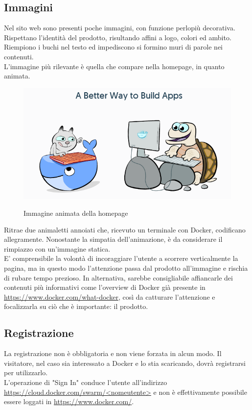 \documentclass[a4paper]{article}
\begin{document}
\subsection{Immagini}
Nel sito web sono presenti poche immagini, con funzione perlopiù decorativa. Rispettano l'identità del prodotto, risultando affini a logo, colori ed ambito. Riempiono i buchi nel testo ed impediscono si formino muri di parole nei contenuti.
\\
L'immagine più rilevante è quella che compare nella homepage, in quanto animata. 

\begin{figure}[H]
	\centering
	\includegraphics[width=\linewidth]{images/animalihomepage.png}
    \label{fig:animalianimati}
    \caption{Immagine animata della homepage}
\end{figure}

\noindent Ritrae due animaletti annoiati che, ricevuto un terminale con Docker, codificano allegramente. Nonostante la simpatia dell'animazione, è da considerare il rimpiazzo con un'immagine statica.
\\
E' comprensibile la volontà di incoraggiare l'utente a scorrere verticalmente la pagina, ma in questo modo l'attenzione passa dal prodotto all'immagine e rischia di rubare tempo prezioso. In alternativa, sarebbe consigliabile affiancarle dei contenuti più informativi come l'overview di Docker già presente in \url{https://www.docker.com/what-docker}, così da catturare l'attenzione e focalizzarla su ciò che è importante: il prodotto.

\subsection{Registrazione}
La registrazione non è obbligatoria e non viene forzata in alcun modo. Il visitatore, nel caso sia interessato a Docker e lo stia scaricando, dovrà registrarsi per utilizzarlo.
\\
L'operazione di "Sign In" conduce l'utente all'indirizzo \url{https://cloud.docker.com/swarm/<nomeutente>} e non è effettivamente possibile essere loggati in \url{https://www.docker.com/}.
\end{document}
